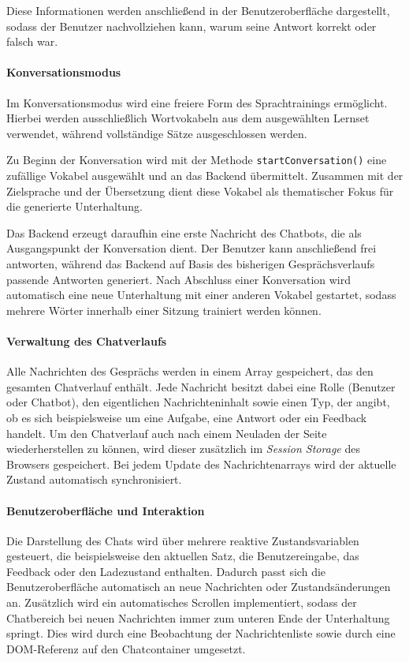 Diese Informationen werden anschließend in der Benutzeroberfläche dargestellt, sodass der Benutzer nachvollziehen kann, warum seine Antwort korrekt oder falsch war.

\paragraph{Konversationsmodus}

Im Konversationsmodus wird eine freiere Form des Sprachtrainings ermöglicht. 
Hierbei werden ausschließlich Wortvokabeln aus dem ausgewählten Lernset verwendet, während vollständige Sätze ausgeschlossen werden.

Zu Beginn der Konversation wird mit der Methode \texttt{startConversation()} eine zufällige Vokabel ausgewählt und an das Backend übermittelt. 
Zusammen mit der Zielsprache und der Übersetzung dient diese Vokabel als thematischer Fokus für die generierte Unterhaltung.

Das Backend erzeugt daraufhin eine erste Nachricht des Chatbots, die als Ausgangspunkt der Konversation dient. 
Der Benutzer kann anschließend frei antworten, während das Backend auf Basis des bisherigen Gesprächsverlaufs passende Antworten generiert. 
Nach Abschluss einer Konversation wird automatisch eine neue Unterhaltung mit einer anderen Vokabel gestartet, sodass mehrere Wörter innerhalb einer Sitzung trainiert werden können.

\paragraph{Verwaltung des Chatverlaufs}

Alle Nachrichten des Gesprächs werden in einem Array gespeichert, das den gesamten Chatverlauf enthält. 
Jede Nachricht besitzt dabei eine Rolle (Benutzer oder Chatbot), den eigentlichen Nachrichteninhalt sowie einen Typ, der angibt, ob es sich beispielsweise um eine Aufgabe, eine Antwort oder ein Feedback handelt.
Um den Chatverlauf auch nach einem Neuladen der Seite wiederherstellen zu können, wird dieser zusätzlich im \textit{Session Storage} des Browsers gespeichert. 
Bei jedem Update des Nachrichtenarrays wird der aktuelle Zustand automatisch synchronisiert.

\paragraph{Benutzeroberfläche und Interaktion}

Die Darstellung des Chats wird über mehrere reaktive Zustandsvariablen gesteuert, die beispielsweise den aktuellen Satz, die Benutzereingabe, das Feedback oder den Ladezustand enthalten. 
Dadurch passt sich die Benutzeroberfläche automatisch an neue Nachrichten oder Zustandsänderungen an.
Zusätzlich wird ein automatisches Scrollen implementiert, sodass der Chatbereich bei neuen Nachrichten immer zum unteren Ende der Unterhaltung springt. 
Dies wird durch eine Beobachtung der Nachrichtenliste sowie durch eine DOM-Referenz auf den Chatcontainer umgesetzt.

